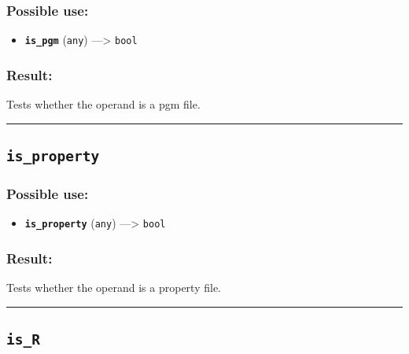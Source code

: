 \documentclass[]{book}
\providecommand{\tightlist}{%
  \setlength{\itemsep}{0pt}\setlength{\parskip}{0pt}}
\theoremstyle{definition}
\theoremstyle{definition}
\theoremstyle{definition}
\theoremstyle{remark}
\begin{document}
\subsubsection{Possible use:}\label{possible-use-299}

\begin{itemize}
\tightlist
\item
  \textbf{\texttt{is\_pgm}} (\texttt{any}) ---\textgreater{}
  \texttt{bool}
\end{itemize}

\subsubsection{Result:}\label{result-289}

Tests whether the operand is a pgm file.

\begin{center}\rule{0.5\linewidth}{\linethickness}\end{center}

\subsection{\texorpdfstring{\texttt{is\_property}}{is\_property}}\label{is_property}

\subsubsection{Possible use:}\label{possible-use-300}

\begin{itemize}
\tightlist
\item
  \textbf{\texttt{is\_property}} (\texttt{any}) ---\textgreater{}
  \texttt{bool}
\end{itemize}

\subsubsection{Result:}\label{result-290}

Tests whether the operand is a property file.

\begin{center}\rule{0.5\linewidth}{\linethickness}\end{center}

\subsection{\texorpdfstring{\texttt{is\_R}}{is\_R}}\label{is_r}
\end{document}
